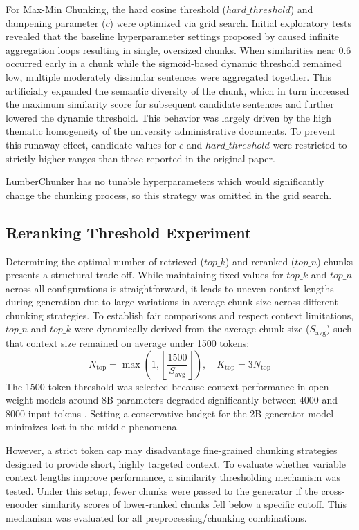 \documentclass[12pt]{article} %
\begin{document}
For Max-Min Chunking, the hard cosine threshold ($hard\_threshold$) and dampening parameter ($c$) were optimized via grid search. Initial exploratory tests revealed that the baseline hyperparameter settings proposed by \textcite{kiss2025maxmin} caused infinite aggregation loops resulting in single, oversized chunks. When similarities near 0.6 occurred early in a chunk while the sigmoid-based dynamic threshold remained low, multiple moderately dissimilar sentences were aggregated together. This artificially expanded the semantic diversity of the chunk, which in turn increased the maximum similarity score for subsequent candidate sentences and further lowered the dynamic threshold. This behavior was largely driven by the high thematic homogeneity of the university administrative documents. To prevent this runaway effect, candidate values for $c$ and $hard\_threshold$ were restricted to strictly higher ranges than those reported in the original paper.

LumberChunker has no tunable hyperparameters which would significantly change the chunking process, so this strategy was omitted in the grid search.
\subsection{Reranking Threshold Experiment}
Determining the optimal number of retrieved ($top\_k$) and reranked ($top\_n$) chunks presents a structural trade-off. While maintaining fixed values for $top\_k$ and $top\_n$ across all configurations is straightforward, it leads to uneven context lengths during generation due to large variations in average chunk size across different chunking strategies. To establish fair comparisons and respect context limitations, $top\_n$ and $top\_k$ were dynamically derived from the average chunk size ($S_{\text{avg}}$) such that context size remained on average under 1500 tokens:
\begin{equation}
    N_{\text{top}} = \max\left(1, \left\lfloor \frac{1500}{S_{\text{avg}}} \right\rfloor\right), \quad K_{\text{top}} = 3 N_{\text{top}}
\end{equation}
The 1500-token threshold was selected because context performance in open-weight models around 8B parameters degraded significantly between 4000 and 8000 input tokens \parencite{leng2024long}. Setting a conservative budget for the 2B generator model minimizes lost-in-the-middle phenomena.

However, a strict token cap may disadvantage fine-grained chunking strategies designed to provide short, highly targeted context. To evaluate whether variable context lengths improve performance, a similarity thresholding mechanism was tested. Under this setup, fewer chunks were passed to the generator if the cross-encoder similarity scores of lower-ranked chunks fell below a specific cutoff. This mechanism was evaluated for all preprocessing/chunking combinations.
\end{document}
